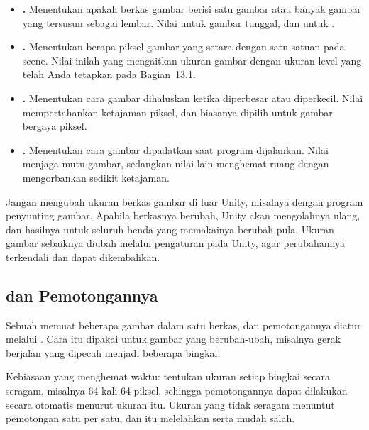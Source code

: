 \begin{itemize}
  \item \textbf{.} Menentukan apakah berkas gambar berisi
        satu gambar atau banyak gambar yang tersusun sebagai lembar. Nilai
         untuk gambar tunggal, dan  untuk
        .
  \item \textbf{.} Menentukan berapa piksel gambar
        yang setara dengan satu satuan pada scene. Nilai inilah yang mengaitkan
        ukuran gambar dengan ukuran level yang telah Anda tetapkan pada
        Bagian~13.1.
  \item \textbf{.} Menentukan cara gambar dihaluskan ketika
        diperbesar atau diperkecil. Nilai  mempertahankan
        ketajaman piksel, dan biasanya dipilih untuk gambar bergaya piksel.
  \item \textbf{.} Menentukan cara gambar dipadatkan saat
        program dijalankan. Nilai  menjaga mutu gambar, sedangkan
        nilai lain menghemat ruang dengan mengorbankan sedikit ketajaman.
\end{itemize}

\begin{peringatanbox}
Jangan mengubah ukuran berkas gambar di luar Unity, misalnya dengan program
penyunting gambar. Apabila berkasnya berubah, Unity akan mengolahnya ulang, dan
hasilnya untuk seluruh benda yang memakainya berubah pula. Ukuran gambar
sebaiknya diubah melalui pengaturan  pada Unity, agar
perubahannya terkendali dan dapat dikembalikan.
\end{peringatanbox}

\subsection{ dan Pemotongannya}

Sebuah  memuat beberapa gambar dalam satu berkas, dan
pemotongannya diatur melalui . Cara itu dipakai untuk
gambar yang berubah-ubah, misalnya gerak berjalan yang dipecah menjadi beberapa
bingkai.

Kebiasaan yang menghemat waktu: tentukan ukuran setiap bingkai secara
seragam, misalnya 64 kali 64 piksel, sehingga pemotongannya dapat dilakukan
secara otomatis menurut ukuran itu. Ukuran yang tidak seragam menuntut
pemotongan satu per satu, dan itu melelahkan serta mudah salah.
